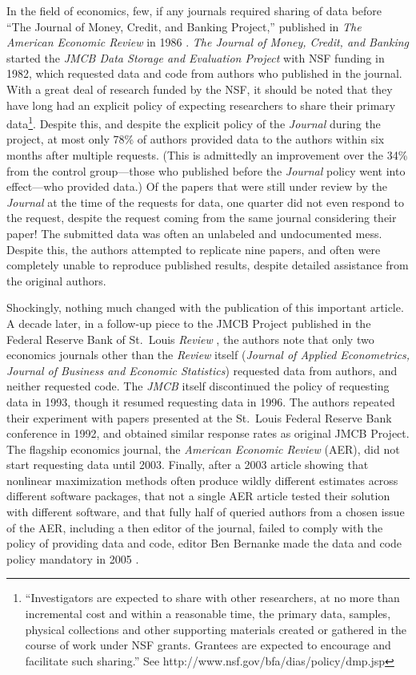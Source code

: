 \documentclass[12pt] {article}
\begin{document}
In the field of economics, few, if any journals required sharing of data
before ``The Journal of Money, Credit, and Banking Project,'' published
in \emph{The American Economic Review} in 1986 \citep{dewald_replication_1986}. \emph{The Journal of Money, Credit, and Banking} started
the \emph{JMCB Data Storage and Evaluation Project} with NSF funding in
1982, which requested data and code from authors who published in the
journal. With a great deal of research funded by the NSF, it should be
noted that they have long had an explicit policy of expecting
researchers to share their primary data\footnote{``Investigators are
  expected to share with other researchers, at no more than incremental
  cost and within a reasonable time, the primary data, samples, physical
  collections and other supporting materials created or gathered in the
  course of work under NSF grants. Grantees are expected to encourage
  and facilitate such sharing.'' See
  http://www.nsf.gov/bfa/dias/policy/dmp.jsp}. Despite this, and despite
the explicit policy of the \emph{Journal} during the project, at most
only 78\% of authors provided data to the authors within six months
after multiple requests. (This is admittedly an improvement over the
34\% from the control group---those who published before the
\emph{Journal} policy went into effect---who provided data.) Of the
papers that were still under review by the \emph{Journal} at the time of
the requests for data, one quarter did not even respond to the request,
despite the request coming from the same journal considering their
paper! The submitted data was often an unlabeled and undocumented mess.
Despite this, the authors attempted to replicate nine papers, and often
were completely unable to reproduce published results, despite detailed
assistance from the original authors.

Shockingly, nothing much changed with the publication of this important
article. A decade later, in a follow-up piece to the JMCB Project
published in the Federal Reserve Bank of St.~Louis \emph{Review}
\citep{anderson_replication_1994}, the authors note that only two economics
journals other than the \emph{Review} itself (\emph{Journal of Applied
Econometrics, Journal of Business and Economic Statistics}) requested
data from authors, and neither requested code. The \emph{JMCB} itself
discontinued the policy of requesting data in 1993, though it resumed
requesting data in 1996. The authors repeated their experiment with
papers presented at the St.~Louis Federal Reserve Bank conference in
1992, and obtained similar response rates as original JMCB Project. The
flagship economics journal, the \emph{American Economic Review} (AER),
did not start requesting data until 2003. Finally, after a 2003 article
showing that nonlinear maximization methods often produce wildly
different estimates across different software packages, that not a
single AER article tested their solution with different software, and
that fully half of queried authors from a chosen issue of the AER,
including a then editor of the journal, failed to comply with the policy
of providing data and code, editor Ben Bernanke made the data and code
policy mandatory in 2005 \citep{mccullough_verifying_2003, mccullough_got_2007}.
\end{document}
